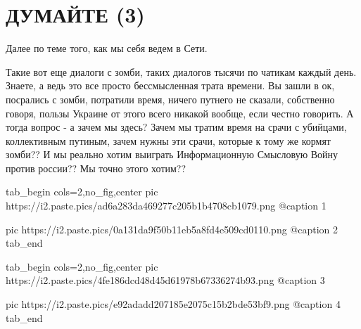  
 
 
 
 

\section{ДУМАЙТЕ (3)}

Далее по теме того, как мы себя ведем в Сети.

Такие вот еще диалоги с зомби, таких диалогов тысячи по чатикам каждый день.
Знаете, а ведь это все просто бессмысленная трата времени. Вы зашли в ок,
посрались с зомби, потратили время, ничего путнего не сказали, собственно
говоря, пользы Украине от этого всего никакой вообще, если честно говорить. А
тогда вопрос - а зачем мы здесь? Зачем мы тратим время на срачи с убийцами,
коллективным путиным, зачем нужны эти срачи, которые к тому же кормят зомби?? И
мы реально хотим выиграть Информационную Смысловую Войну против россии?? Мы
точно этого хотим??

\ifcmt
  tab_begin cols=2,no_fig,center
     pic https://i2.paste.pics/ad6a283da469277c205b1b4708cb1079.png
		 @caption 1

		 pic https://i2.paste.pics/0a131da9f50b11eb5a8fd4e509cd0110.png
		 @caption 2
  tab_end
\fi

\ifcmt
  tab_begin cols=2,no_fig,center
     pic https://i2.paste.pics/4fe186dcd48d45d61978b67336274b93.png
		 @caption 3

		 pic https://i2.paste.pics/e92adadd207185e2075c15b2bde53bf9.png
		 @caption 4
  tab_end
\fi
